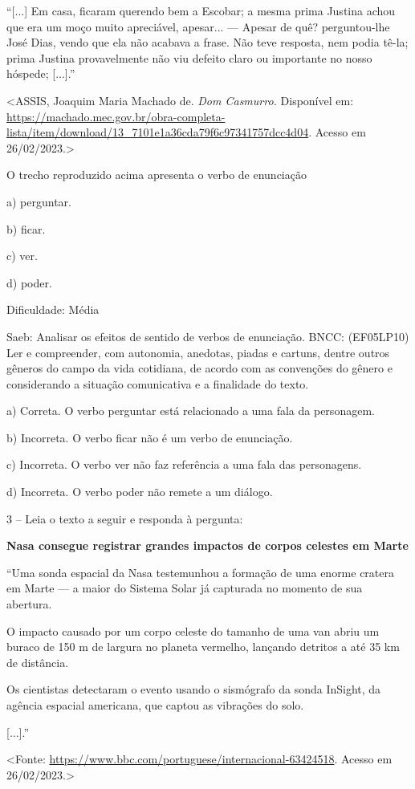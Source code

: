 ``{[}...{]} Em casa, ficaram querendo bem a Escobar; a mesma prima
Justina achou que era um moço muito apreciável, apesar... --- Apesar de
quê? perguntou-lhe José Dias, vendo que ela não acabava a frase. Não
teve resposta, nem podia tê-la; prima Justina provavelmente não viu
defeito claro ou importante no nosso hóspede; {[}...{]}.''

\textless{}ASSIS, Joaquim Maria Machado de. \emph{Dom Casmurro.}
Disponível em:
\url{https://machado.mec.gov.br/obra-completa-lista/item/download/13_7101e1a36cda79f6c97341757dcc4d04}.
Acesso em 26/02/2023.\textgreater{}

O trecho reproduzido acima apresenta o verbo de enunciação

a) perguntar.

b) ficar.

c) ver.

d) poder.

Dificuldade: Média

Saeb: Analisar os efeitos de sentido de verbos de enunciação. BNCC:
(EF05LP10) Ler e compreender, com autonomia, anedotas, piadas e cartuns,
dentre outros gêneros do campo da vida cotidiana, de acordo com as
convenções do gênero e considerando a situação comunicativa e a
finalidade do texto.

a) Correta. O verbo perguntar está relacionado a uma fala da personagem.

b) Incorreta. O verbo ficar não é um verbo de enunciação.

c) Incorreta. O verbo ver não faz referência a uma fala das personagens.

d) Incorreta. O verbo poder não remete a um diálogo.

3 -- Leia o texto a seguir e responda à pergunta:

\textbf{Nasa consegue registrar grandes impactos de corpos celestes em
Marte}

``Uma sonda espacial da Nasa testemunhou a formação de uma enorme
cratera em Marte --- a maior do Sistema Solar já capturada no momento de
sua abertura.

O impacto causado por um corpo celeste do tamanho de uma van abriu um
buraco de 150 m de largura no planeta vermelho, lançando detritos a até
35 km de distância.

Os cientistas detectaram o evento usando o sismógrafo da sonda InSight,
da agência espacial americana, que captou as vibrações do solo.

{[}...{]}.''

\textless{}Fonte:
\url{https://www.bbc.com/portuguese/internacional-63424518}. Acesso em
26/02/2023.\textgreater{}

